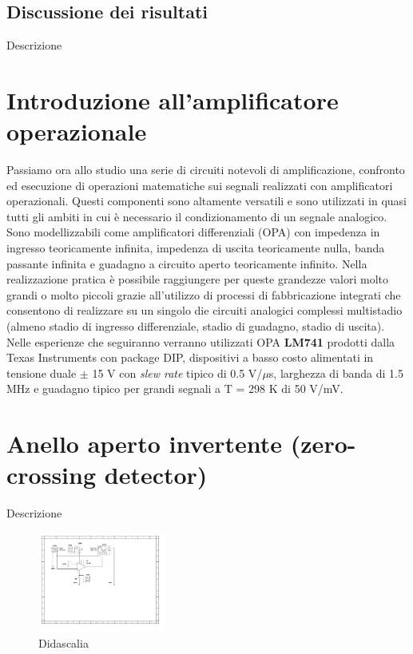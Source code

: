 \documentclass[journal]{IEEEtran}
\begin{document}
\subsection{\textbf{Discussione dei risultati}}
Descrizione


\section{\textbf{Introduzione all'amplificatore operazionale}}
Passiamo ora allo studio una serie di circuiti notevoli di amplificazione, confronto ed esecuzione di operazioni matematiche sui segnali realizzati con amplificatori operazionali. Questi componenti sono altamente versatili e sono utilizzati in quasi tutti gli ambiti in cui è necessario il condizionamento di un segnale analogico. Sono modellizzabili come amplificatori differenziali (OPA) con impedenza in ingresso teoricamente infinita, impedenza di uscita teoricamente nulla, banda passante infinita e guadagno a circuito aperto teoricamente infinito. Nella realizzazione pratica è possibile raggiungere per queste grandezze valori molto grandi o molto piccoli grazie all'utilizzo di processi di fabbricazione integrati che consentono di realizzare su un singolo die circuiti analogici complessi multistadio (almeno stadio di ingresso differenziale, stadio di guadagno, stadio di uscita). Nelle esperienze che seguiranno verranno utilizzati OPA \textbf{LM741} prodotti dalla Texas Instruments con package DIP, dispositivi a basso costo alimentati in tensione duale $\pm$ 15 V con \textit{slew rate} tipico di 0.5 V/$\mu$s, larghezza di banda di 1.5 MHz e guadagno tipico per grandi segnali a T = 298 K di 50 V/mV.

\section{\textbf{Anello aperto invertente (zero-crossing detector)}} %
Descrizione

\begin{figure}[H]%
\begin {center}
\includegraphics[width=0.38\textwidth]{sch-simulations/output/OPA-open-loop-inverting.pdf}
\caption{Didascalia}
\label{fig:oscilloscope}
\end {center}
\end{figure}
\end{document}
